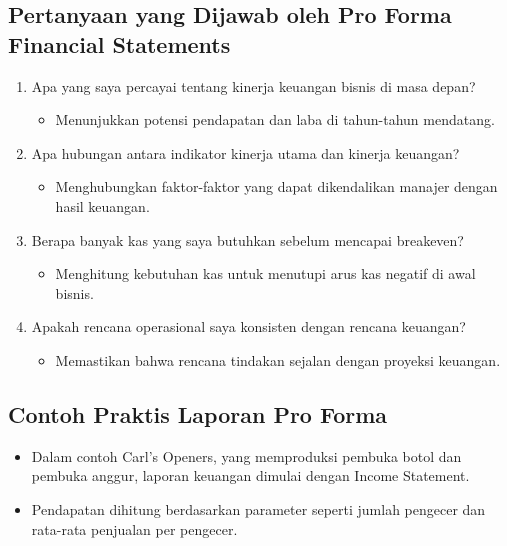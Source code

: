 \documentclass{article}
\begin{document}
\subsection{Pertanyaan yang Dijawab oleh Pro Forma Financial Statements}
\begin{enumerate}
    \item Apa yang saya percayai tentang kinerja keuangan bisnis di masa depan?
          \begin{itemize}
              \item Menunjukkan potensi pendapatan dan laba di tahun-tahun mendatang.
          \end{itemize}
    \item Apa hubungan antara indikator kinerja utama dan kinerja keuangan?
          \begin{itemize}
              \item Menghubungkan faktor-faktor yang dapat dikendalikan manajer dengan hasil keuangan.
          \end{itemize}
    \item Berapa banyak kas yang saya butuhkan sebelum mencapai breakeven?
          \begin{itemize}
              \item Menghitung kebutuhan kas untuk menutupi arus kas negatif di awal bisnis.

          \end{itemize}
    \item Apakah rencana operasional saya konsisten dengan rencana keuangan?
          \begin{itemize}
              \item Memastikan bahwa rencana tindakan sejalan dengan proyeksi keuangan.

          \end{itemize}
\end{enumerate}

\subsection{Contoh Praktis Laporan Pro Forma}
\begin{itemize}
    \item Dalam contoh Carl's Openers, yang memproduksi pembuka botol dan pembuka anggur, laporan keuangan dimulai dengan Income Statement.
    \item Pendapatan dihitung berdasarkan parameter seperti jumlah pengecer dan rata-rata penjualan per pengecer.
\end{itemize}
\end{document}

